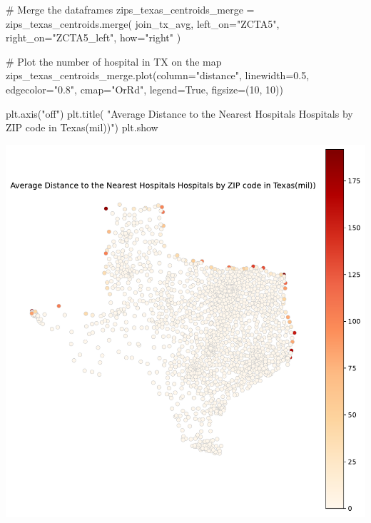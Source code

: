 \documentclass[
  letterpaper,
  DIV=11,
  numbers=noendperiod]{scrartcl}
\newenvironment{Shaded}{\begin{snugshade}}{\end{snugshade}}
\newcommand{\CommentTok}[1]{\textcolor[rgb]{0.37,0.37,0.37}{#1}}
\newcommand{\DecValTok}[1]{\textcolor[rgb]{0.68,0.00,0.00}{#1}}
\newcommand{\FloatTok}[1]{\textcolor[rgb]{0.68,0.00,0.00}{#1}}
\newcommand{\NormalTok}[1]{\textcolor[rgb]{0.00,0.23,0.31}{#1}}
\newcommand{\OperatorTok}[1]{\textcolor[rgb]{0.37,0.37,0.37}{#1}}
\newcommand{\StringTok}[1]{\textcolor[rgb]{0.13,0.47,0.30}{#1}}
\newcommand{\VariableTok}[1]{\textcolor[rgb]{0.07,0.07,0.07}{#1}}
\begin{document}
\begin{Shaded}
\begin{Highlighting}[]
\CommentTok{\# Merge the dataframes}
\NormalTok{zips\_texas\_centroids\_merge }\OperatorTok{=}\NormalTok{ zips\_texas\_centroids.merge(}
\NormalTok{    join\_tx\_avg,}
\NormalTok{    left\_on}\OperatorTok{=}\StringTok{"ZCTA5"}\NormalTok{,}
\NormalTok{    right\_on}\OperatorTok{=}\StringTok{"ZCTA5\_left"}\NormalTok{,}
\NormalTok{    how}\OperatorTok{=}\StringTok{"right"}
\NormalTok{)}

\CommentTok{\# Plot the number of hospital in TX on the map}
\NormalTok{zips\_texas\_centroids\_merge.plot(column}\OperatorTok{=}\StringTok{"distance"}\NormalTok{, linewidth}\OperatorTok{=}\FloatTok{0.5}\NormalTok{,}
\NormalTok{                                edgecolor}\OperatorTok{=}\StringTok{"0.8"}\NormalTok{, cmap}\OperatorTok{=}\StringTok{"OrRd"}\NormalTok{, legend}\OperatorTok{=}\VariableTok{True}\NormalTok{, figsize}\OperatorTok{=}\NormalTok{(}\DecValTok{10}\NormalTok{, }\DecValTok{10}\NormalTok{))}

\NormalTok{plt.axis(}\StringTok{"off"}\NormalTok{)}
\NormalTok{plt.title(}
    \StringTok{"Average Distance to the Nearest Hospitals Hospitals by ZIP code in Texas(mil))"}\NormalTok{)}
\NormalTok{plt.show}
\end{Highlighting}
\end{Shaded}

\includegraphics{pset4_files/figure-pdf/cell-34-output-1.pdf}
\end{document}
